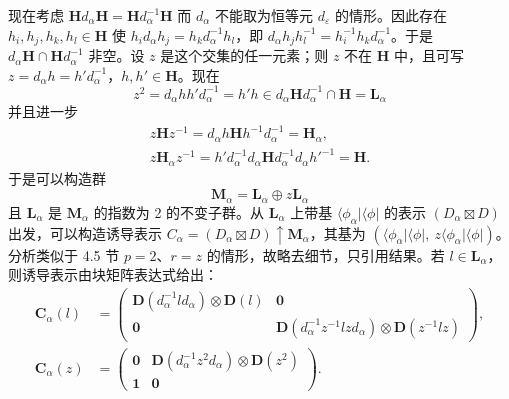 现在考虑 $\mathbf{H}d_{\alpha}\mathbf{H} = \mathbf{H}d^{-1}_{\alpha}\mathbf{H}$ 而 $d_{\alpha}$ 不能取为恒等元 $d_{\varepsilon}$ 的情形。因此存在 $h_{i}, h_{j}, h_{k}, h_{l} \in \mathbf{H}$ 使 $h_{i}d_{\alpha}h_{j} = h_{k}d^{-1}_{\alpha}h_{l}$，即 $d_{\alpha}h_{j}h^{-1}_{l} = h^{-1}_{i}h_{k}d^{-1}_{\alpha}$。于是 $d_{\alpha}\mathbf{H} \cap \mathbf{H}d^{-1}_{\alpha}$ 非空。设 $z$ 是这个交集的任一元素；则 $z$ 不在 $\mathbf{H}$ 中，且可写 $z = d_{\alpha}h = h'd^{-1}_{\alpha}$，$h, h' \in \mathbf{H}$。现在
\begin{equation*}
z^{2} = d_{\alpha}hh'd^{-1}_{\alpha} = h'h \in d_{\alpha}\mathbf{H}d^{-1}_{\alpha} \cap \mathbf{H} = \mathbf{L}_{\alpha}
\end{equation*}
并且进一步
\begin{equation*}
\begin{array}{l}
z\mathbf{H}z^{-1} = d_{\alpha}h\mathbf{H}h^{-1}d^{-1}_{\alpha} = \mathbf{H}_{\alpha},\\
z\mathbf{H}_{\alpha}z^{-1} = h'd^{-1}_{\alpha}d_{\alpha}\mathbf{H}d^{-1}_{\alpha}d_{\alpha}h'^{-1} = \mathbf{H}.
\end{array}
\end{equation*}
于是可以构造群
\begin{equation*}
\mathbf{M}_{\alpha} = \mathbf{L}_{\alpha} \oplus z\mathbf{L}_{\alpha}
\tag{4.8.12}
\end{equation*}
且 $\mathbf{L}_{\alpha}$ 是 $\mathbf{M}_{\alpha}$ 的指数为 2 的不变子群。从 $\mathbf{L}_{\alpha}$ 上带基 $\langle \phi_{\alpha}|\langle \phi |$ 的表示 $(D_{\alpha} \boxtimes D)$ 出发，可以构造诱导表示 $C_{\alpha} = (D_{\alpha} \boxtimes D) \uparrow \mathbf{M}_{\alpha}$，其基为 $(\langle \phi_{\alpha}|\langle \phi |,\ z\langle \phi_{\alpha}|\langle \phi |)$。分析类似于 4.5 节 $p = 2$、$r = z$ 的情形，故略去细节，只引用结果。若 $l \in \mathbf{L}_{\alpha}$，则诱导表示由块矩阵表达式给出：
\begin{equation*}
\begin{array}{rl}
\mathbf{C}_{\alpha}(l) &= \begin{pmatrix} \mathbf{D}(d^{-1}_{\alpha}ld_{\alpha}) \otimes \mathbf{D}(l) & \mathbf{0}\\ \mathbf{0} & \mathbf{D}(d^{-1}_{\alpha}z^{-1}lzd_{\alpha}) \otimes \mathbf{D}(z^{-1}lz) \end{pmatrix},\\
\mathbf{C}_{\alpha}(z) &= \begin{pmatrix} \mathbf{0} & \mathbf{D}(d^{-1}_{\alpha}z^{2}d_{\alpha}) \otimes \mathbf{D}(z^{2})\\ \mathbf{1} & \mathbf{0} \end{pmatrix}.
\end{array}
\tag{4.8.13}
\end{equation*}

